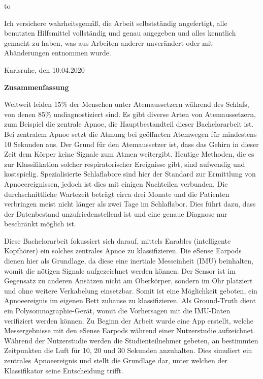 \thispagestyle{empty}
\vspace*{42\baselineskip}
\hbox to \textwidth{\hrulefill}
\par
Ich versichere wahrheitsgemäß, die Arbeit selbstständig angefertigt, alle benutzten Hilfsmittel vollständig und genau angegeben und alles kenntlich gemacht zu haben, was aus Arbeiten anderer unverändert oder mit Abänderungen entnommen wurde.

Karlsruhe, den 10.04.2020

\cleardoublepage

\vspace*{1em}
\begin{center}
	\textbf{Zusammenfassung}
\end{center}
\par
Weltweit leiden 15\% der Menschen unter Atemaussetzern während des Schlafs, von denen 85\% undiagnostiziert sind. 
Es gibt diverse Arten von Atemaussetzern, zum Beispiel die zentrale Apnoe, die Hauptbestandteil dieser Bachelorarbeit ist.
Bei zentralem Apnoe setzt die Atmung bei geöffneten Atemwegen für mindestens 10 Sekunden aus. Der Grund für den Atemaussetzer ist, dass das Gehirn in dieser Zeit dem Körper keine Signale zum Atmen weitergibt.
Heutige Methoden, die es zur Klassifikation solcher respiratorischer Ereignisse gibt, sind aufwendig und kostspielig. 
Spezialisierte Schlaflabore sind hier der Standard zur Ermittlung von Apnoeereignissen, jedoch ist dies mit einigen Nachteilen verbunden.
Die durchschnittliche Wartezeit beträgt circa drei Monate und die Patienten verbringen meist nicht länger als zwei Tage im Schlaflabor.
Dies führt dazu, dass der Datenbestand unzufriedenstellend ist und eine genaue Diagnose nur beschränkt möglich ist.

Diese Bachelorarbeit fokussiert sich darauf, mittels Earables (intelligente Kopfhörer) ein solches zentrales Apnoe zu klassifizieren.
Die eSense Earpods dienen hier als Grundlage, da diese eine inertiale Messeinheit (IMU) beinhalten, womit die nötigen Signale aufgezeichnet werden können. 
Der Sensor ist im Gegensatz zu anderen Ansätzen nicht am Oberkörper, sondern im Ohr platziert und ohne weitere Verkabelung einsetzbar.
Somit ist eine Möglichkeit geboten, ein Apnoeereignis im eigenen Bett zuhause zu klassifizieren.
Als Ground-Truth dient ein Polysomnographie-Gerät, womit die Vorhersagen mit die IMU-Daten verifiziert werden können.
Zu Beginn der Arbeit wurde eine App erstellt, welche Messergebnisse mit den eSense Earpods während einer Nutzerstudie aufzeichnet.
Während der Nutzerstudie werden die Studienteilnehmer gebeten, an bestimmten Zeitpunkten die Luft für 10, 20 und 30 Sekunden anzuhalten.
Dies simuliert ein zentrales Apnoeereignis und stellt die Grundlage dar, unter welchen der Klassifikator seine Entscheidung trifft.

